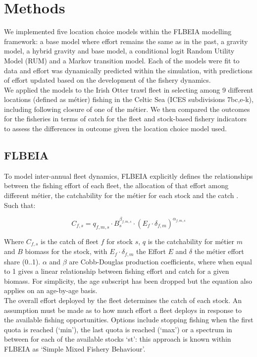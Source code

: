 \documentclass[12pt, halfline, a4paper]{ouparticle}
\begin{document}
\section{Methods}
\label{meth}

We implemented five location choice models within the FLBEIA modelling
framework: a base model where effort remains the same as in the past, a gravity
model, a hybrid gravity and base model, a conditional logit Random Utility
Model (RUM) and a Markov transition model. Each of the models were fit to data
and effort was dynamically predicted within the simulation, with predictions of
effort updated based on the development of the fishery dynamics.  \\

We applied the models to the Irish Otter trawl fleet in selecting among 9
different locations (defined as métier) fishing in the Celtic Sea (ICES
subdivisions 7bc,e-k), including following closure of one of the métier. We
then compared the outcomes for the fisheries in terms of catch for the fleet
and stock-based fishery indicators to assess the differences in outcome given
the location choice model used.

\subsection{FLBEIA}

To model inter-annual fleet dynamics, FLBEIA explicitly defines the
relationships between the fishing effort of each fleet, the allocation of that
effort among different métier, the catchability for the métier for each stock
and the catch \citep{Garcia2017a}. Such that:

\begin{equation}
 C_{f,s} = q_{f,m,s}\cdot B_{s}^{\beta_{f,m,s}} \cdot \left(E_{f}\cdot
	 \delta_{f,m} \right)^{\alpha_{f,m,s}}	
\end{equation}

Where $C_{f,s}$ is the catch of fleet $f$ for stock $s$, $q$ is the
catchability for métier $m$ and $B$ biomass for the stock, with $E_{f}\cdot
\delta_{f,m}$ the Effort $E$ and $\delta$ the métier effort share (0..1).
$\alpha$ and $\beta$ are Cobb-Douglas production coefficients, where when equal
to 1 gives a linear relationship between fishing effort and catch for a given
biomass. For simplicity, the age subscript has been dropped but the equation
also applies on an age-by-age basis. \\

The overall effort deployed by the fleet determines the catch of each stock. An
assumption must be made as to how much effort a fleet deploys in response to
the available fishing opportunities. Options include stopping fishing when the
first quota is reached (`min'), the last quota is reached (`max') or a spectrum
in between for each of the available stocks `st': this approach is known within
FLBEIA as `Simple Mixed Fishery Behaviour'.  \\
\end{document}
